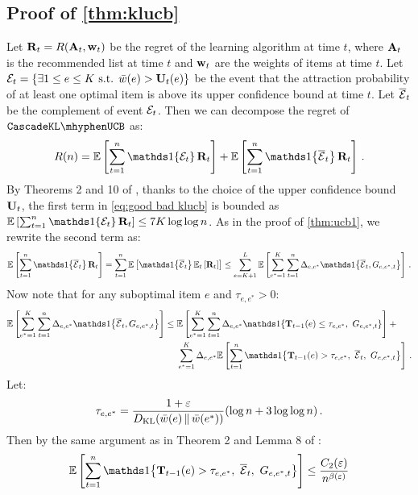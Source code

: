 \subsection{Proof of \cref{thm:klucb}}
\label{sec:proof klucb}

Let $\mathbf{R}_t = R(\mathbf{A}_t, \mathbf{w}_t)$ be the regret of the learning algorithm at time $t$, where $\mathbf{A}_t$ is the recommended list at time $t$ and $\mathbf{w}_t$ are the weights of items at time $t$. Let $\mathcal{E}_t = \left\{\exists 1 \leq e \leq K \text{ s.t. } \bar{w}(e) > \mathbf{U}_t(e)\right\}$ be the event that the attraction probability of at least one optimal item is above its upper confidence bound at time $t$. Let $\overline{\mathcal{E}}_t$ be the complement of event $\mathcal{E}_t$. Then we can decompose the regret of $\cascadeklucb$ as:
\begin{align}
  R(n) =
  \EE{\sum_{t = 1}^n \I{\cE_t} \rnd{R}_t} +
  \EE{\sum_{t = 1}^n \I{\ccE_t} \rnd{R}_t}\,.
  \label{eq:good bad klucb}
\end{align}
By Theorems 2 and 10 of \citet{garivier11klucb}, thanks to the choice of the upper confidence bound $\mathbf{U}_t$, the first term in \eqref{eq:good bad klucb} is bounded as $\EE{\sum_{t = 1}^n \I{\cE_t} \rnd{R}_t} \leq 7 K \log \log n$. As in the proof of \cref{thm:ucb1}, we rewrite the second term as:
\begin{align*}
  \EE{\sum_{t = 1}^n \I{\ccE_t} \rnd{R}_t} =
  \sum_{t = 1}^n \EE{\I{\ccE_t} \EEt{\rnd{R}_t}} \leq
  \sum_{e = K + 1}^L \EE{\sum_{e^\ast = 1}^K \sum_{t = 1}^n \Delta_{e, e^\ast} \I{\ccE_t, G_{e, e^\ast, t}}}\,.
\end{align*}
Now note that for any suboptimal item $e$ and $\tau_{e, e^\ast} > 0$:
\begin{align}
  \EE{\sum_{e^\ast = 1}^K \sum_{t = 1}^n \Delta_{e, e^\ast} \I{\ccE_t, G_{e, e^\ast, t}}}
  & \leq \EE{\sum_{e^\ast = 1}^K \sum_{t = 1}^n
  \Delta_{e, e^\ast} \I{\rnd{T}_{t - 1}(e) \leq \tau_{e, e^\ast}, \ G_{e, e^\ast, t}}} + {} \label{eq:pull split} \\
  & \phantom{{} = {}} \sum_{e^\ast = 1}^K \Delta_{e, e^\ast}
  \EE{\sum_{t = 1}^n \I{\rnd{T}_{t - 1}(e) > \tau_{e, e^\ast}, \ \ccE_t, \ G_{e, e^\ast, t}}}\,. \nonumber
\end{align}
Let:
\begin{align*}
  \tau_{e, e^\ast} = \frac{1 + \varepsilon}{D_\mathrm{KL}(\bar{w}(e) \,\|\, \bar{w}(e^\ast))}(\log n + 3 \log \log n)\,.
\end{align*}
Then by the same argument as in Theorem 2 and Lemma 8 of \citet{garivier11klucb}:
\begin{align*}
  \EE{\sum_{t = 1}^n \I{\rnd{T}_{t - 1}(e) > \tau_{e, e^\ast}, \ \ccE_t, \ G_{e, e^\ast, t}}} \leq
  \frac{C_2(\eps)}{n^{\beta(\eps)}}
\end{align*}
